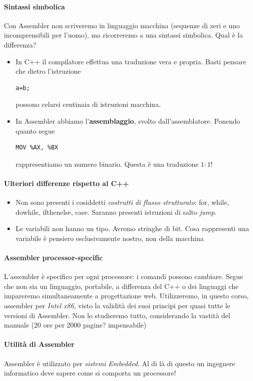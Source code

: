 \documentclass[11pt]{report}
\begin{document}
\paragraph{Sintassi simbolica} Con Assembler non scriveremo in linguaggio macchina (sequenze di zeri e uno incomprensibili per l'uomo), ma ricorreremo a una sintassi simbolica. Qual è la differenza?
\begin{itemize}
\item In C++ il compilatore effettua una traduzione vera e propria. Basti pensare che dietro l'istruzione
\begin{verbatim}
a=b;
\end{verbatim}
possono celarsi centinaia di istruzioni macchina.
\item In Assembler abbiamo l'\textbf{assemblaggio}, svolto dall'assemblatore.  Ponendo quanto segue
\begin{verbatim}
MOV %AX, %BX
\end{verbatim}
rappresentiamo un numero binario. Questa è una traduzione $1:1$!
\end{itemize}
\paragraph{Ulteriori differenze rispetto al C++}
\begin{itemize}
\item Non sono presenti i cosiddetti \emph{costrutti di flusso strutturato}: for, while, dowhile, ifthenelse, case. Saranno presenti istruzioni di salto \emph{jump}.
\item Le variabili non hanno un tipo. Avremo stringhe di bit. Cosa rappresenti una variabile è pensiero esclusivamente nostro, non della macchina
\end{itemize}
\paragraph{Assembler processor-specific} L'assembler è specifico per ogni processore: i comandi possono cambiare. Segue che non sia un linguaggio, portabile, a differenza del C++ o dei linguaggi che impareremo simultaneamente a progettazione web. Utilizzeremo, in questo corso, assembler per \emph{Intel x86}, visto la validità dei suoi principi per quasi tutte le versioni di Assembler. Non lo studieremo tutto, considerando la vastità del manuale (20 ore per 2000 pagine? impensabile)
\paragraph{Utilità di Assembler} Assembler è utilizzato per \emph{sistemi Embedded}. Al di là di questo un ingegnere informatico deve sapere come si comporta un processore!
\end{document}
